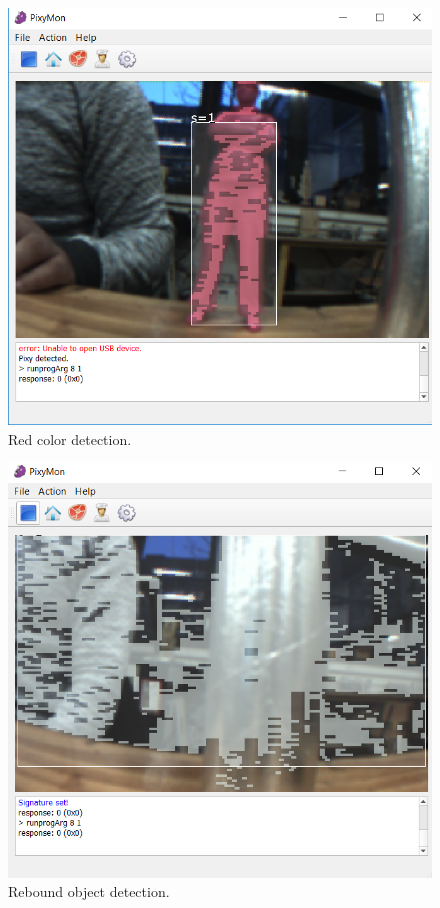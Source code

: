 \documentclass[english]{book_template} %
\begin{document}
\begin{figure}[H]
\center
\caption{Red color detection.\label{fig:redcolor}}
\includegraphics[scale=0.5]{./img/pixyRedcolor}
\end{figure} 


\begin{figure}[H]
\center
\caption{Rebound object detection.\label{fig:reboundColor}}
\includegraphics[scale=0.5]{./img/pixyAluminuim}
\end{figure} 
\end{document}
